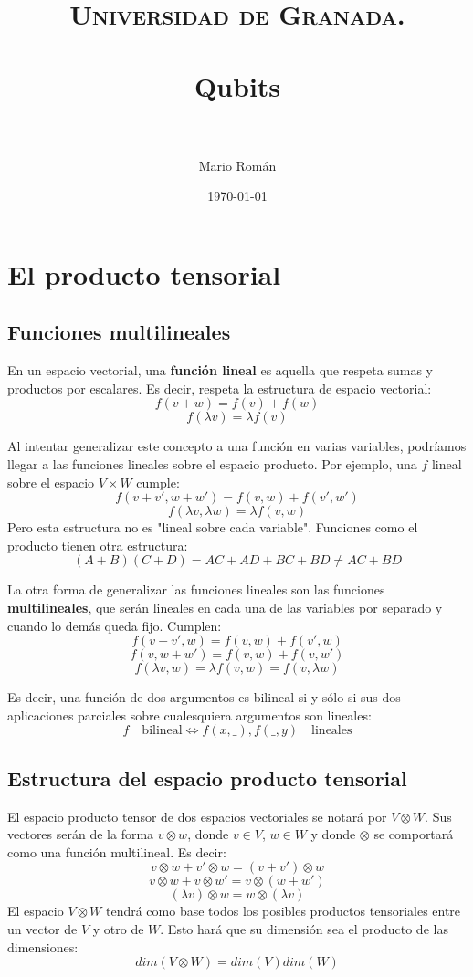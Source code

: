 \documentclass[paper=a4, fontsize=11pt, spanish]{scrartcl}
\title{
  \normalfont \normalsize 
  \textsc{Universidad de Granada.} \\ [25pt] %
  \horrule{0.5pt} \\[0.4cm] %
  \huge Qubits \\ %
  \horrule{2pt} \\[0.5cm] %
}
\author{Mario Román} %
\date{\normalsize\today} %
\numberwithin{equation}{section} %
\numberwithin{figure}{section} %
\numberwithin{table}{section} %
\begin{document}
\maketitle %

\section {El producto tensorial}
  \subsection {Funciones multilineales}
    En un espacio vectorial, una \textbf{función lineal} es aquella que respeta sumas y productos por escalares.
    Es decir, respeta la estructura de espacio vectorial:
    $$ f(v+w) = f(v) + f(w) $$
    $$ f(\lambda v) = \lambda f(v) $$

    Al intentar generalizar este concepto a una función en varias variables, podríamos llegar a las funciones 
    lineales sobre el espacio producto. Por ejemplo, una $f$ lineal sobre el espacio $V \times W$ cumple:
    $$ f(v+v',w+w') = f(v,w) + f(v',w')$$
    $$ f(\lambda v, \lambda w) = \lambda f(v,w) $$
    Pero esta estructura no es "lineal sobre cada variable". Funciones como el producto tienen otra
    estructura:
    $$ (A+B)(C+D) = AC+AD+BC+BD \neq AC+BD $$
    
    La otra forma de generalizar las funciones lineales son las funciones \textbf{multilineales}, que serán lineales
    en cada una de las variables por separado y cuando lo demás queda fijo. Cumplen:
    $$ f(v+v',w) = f(v,w) + f(v',w) $$
    $$ f(v,w+w') = f(v,w) + f(v,w') $$
    $$ f(\lambda v,w) = \lambda f(v,w) = f(v,\lambda w) $$

    Es decir, una función de dos argumentos es bilineal si y sólo si sus dos aplicaciones parciales sobre
    cualesquiera argumentos son lineales:
    $$ f\quad \mbox{bilineal} \Leftrightarrow f(x,\_), f(\_,y)\quad \mbox{lineales} $$
    
  \subsection{Estructura del espacio producto tensorial}
    El espacio producto tensor de dos espacios vectoriales se notará por $V \otimes W$. Sus vectores serán de
    la forma $v \otimes w$, donde $v \in V$, $w \in W$ y donde $\otimes$ se comportará como una función multilineal.
    Es decir:
    $$ v \otimes w + v' \otimes w  = (v+v') \otimes w $$
    $$ v \otimes w + v \otimes w'  = v \otimes (w+w') $$
    $$ (\lambda v) \otimes w = w \otimes (\lambda v)  $$
    El espacio $V \otimes W$ tendrá como base todos los posibles productos tensoriales entre un vector de $V$ y otro
    de $W$. Esto hará que su dimensión sea el producto de las dimensiones:
    $$ dim(V \otimes W) = dim(V)dim(W) $$
    
\end{document}
